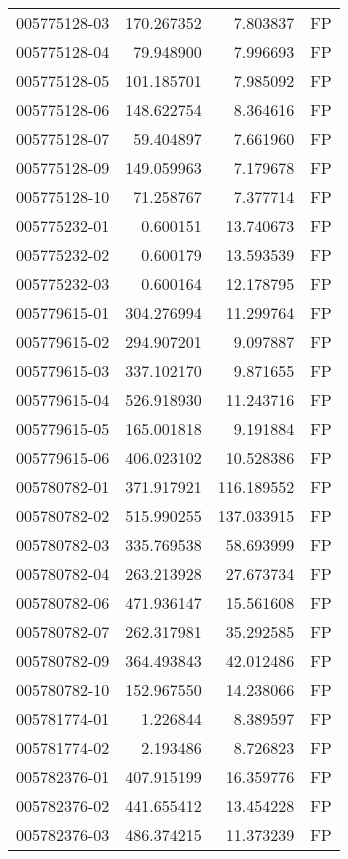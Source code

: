 \begin{tabular}{lrrl}
005775128-03 &  170.267352 &     7.803837 &   FP \\
005775128-04 &   79.948900 &     7.996693 &   FP \\
005775128-05 &  101.185701 &     7.985092 &   FP \\
005775128-06 &  148.622754 &     8.364616 &   FP \\
005775128-07 &   59.404897 &     7.661960 &   FP \\
005775128-09 &  149.059963 &     7.179678 &   FP \\
005775128-10 &   71.258767 &     7.377714 &   FP \\
005775232-01 &    0.600151 &    13.740673 &   FP \\
005775232-02 &    0.600179 &    13.593539 &   FP \\
005775232-03 &    0.600164 &    12.178795 &   FP \\
005779615-01 &  304.276994 &    11.299764 &   FP \\
005779615-02 &  294.907201 &     9.097887 &   FP \\
005779615-03 &  337.102170 &     9.871655 &   FP \\
005779615-04 &  526.918930 &    11.243716 &   FP \\
005779615-05 &  165.001818 &     9.191884 &   FP \\
005779615-06 &  406.023102 &    10.528386 &   FP \\
005780782-01 &  371.917921 &   116.189552 &   FP \\
005780782-02 &  515.990255 &   137.033915 &   FP \\
005780782-03 &  335.769538 &    58.693999 &   FP \\
005780782-04 &  263.213928 &    27.673734 &   FP \\
005780782-06 &  471.936147 &    15.561608 &   FP \\
005780782-07 &  262.317981 &    35.292585 &   FP \\
005780782-09 &  364.493843 &    42.012486 &   FP \\
005780782-10 &  152.967550 &    14.238066 &   FP \\
005781774-01 &    1.226844 &     8.389597 &   FP \\
005781774-02 &    2.193486 &     8.726823 &   FP \\
005782376-01 &  407.915199 &    16.359776 &   FP \\
005782376-02 &  441.655412 &    13.454228 &   FP \\
005782376-03 &  486.374215 &    11.373239 &   FP \\

\end{tabular}
